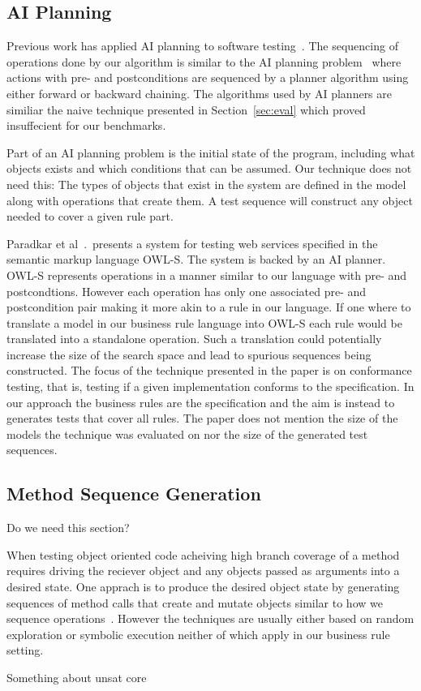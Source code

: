 \subsection{AI Planning}

Previous work has applied AI planning to software
testing~\cite{Scheetz99ai,Howe97testcase}. The sequencing of
operations done by our algorithm is similar to the AI planning
problem~\cite{Weld94} where actions with pre- and postconditions are sequenced
by a planner algorithm using either forward or backward chaining. The
algorithms used by AI planners are similiar the naive technique
presented in Section~\ref{sec:eval} which proved insuffecient for our
benchmarks. 

Part of an AI planning problem is the initial state of the program,
including what objects exists and which conditions that can be
assumed. Our technique does not need this: The types of objects that
exist in the system are defined in the model along with operations
that create them. A test sequence will construct any object needed to
cover a given rule part.

Paradkar et al~\cite{conf/icws/ParadkarSWJOSL07}.\ presents a system
for testing web services specified in the semantic markup language
OWL-S. The system is backed by an AI planner. OWL-S represents
operations in a manner similar to our language with pre- and
postcondtions. However each operation has only one associated pre- and
postcondition pair making it more akin to a rule in our language. If
one where to translate a model in our business rule language into
OWL-S each rule would be translated into a standalone operation. Such
a translation could potentially increase the size of the search space
and lead to spurious sequences being constructed. The focus of the
technique presented in the paper is on conformance testing, that is,
testing if a given implementation conforms to the specification. In
our approach the business rules are the specification and the aim is
instead to generates tests that cover all rules. The paper does not
mention the size of the models the technique was evaluated on nor the
size of the generated test sequences.

\subsection{Method Sequence Generation}

Do we need this section?

When testing object oriented code acheiving high branch coverage of a
method requires driving the reciever object and any objects passed as
arguments into a desired state. One apprach is to produce the desired
object state by generating sequences of method calls that create and
mutate objects similar to how we sequence
operations~\cite{pacheco2007,tillmann2008,thummalapenta2011}. However
the techniques are usually either based on random exploration or
symbolic execution neither of which apply in our business rule setting.

Something about unsat core
